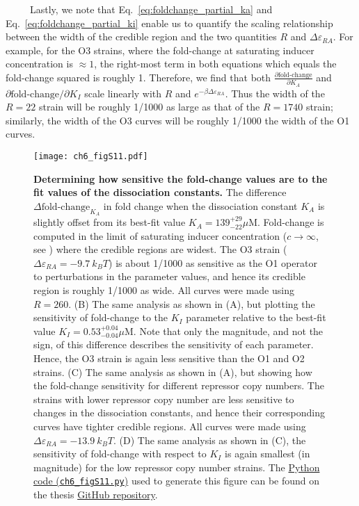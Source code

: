 \documentclass[12pt]{caltech_thesis}
\begin{document}
~~~~~Lastly, we note that Eq.~\ref{eq:foldchange_partial_ka} and
Eq.~\ref{eq:foldchange_partial_ki} enable us to quantify the scaling
relationship between the width of the credible region and the two
quantities \(R\) and \(\Delta\varepsilon_{RA}\). For example, for the O3
strains, where the fold-change at saturating inducer concentration is
\(\approx 1\), the right-most term in both equations which equals the
fold-change squared is roughly 1. Therefore, we find that both
\(\frac{\partial  \text{fold-change}}{\partial K_A}\) and
\(\partial \text{fold-change}/\partial K_I\) scale linearly with \(R\)
and \(e^{-\beta \Delta\varepsilon_{RA}}\). Thus the width of the
\(R=22\) strain will be roughly 1/1000 as large as that of the
\(R=1740\) strain; similarly, the width of the O3 curves will be roughly
1/1000 the width of the O1 curves.

\hypertarget{fig:kaki_sensitivity}{%
\begin{figure}
\centering
\texttt{[image: ch6\_figS11.pdf]}
\caption[{Sensitivity analysis of the fold-change function to \(K_A\)
and \(K_I\) estimates.}]{\textbf{Determining how sensitive the
fold-change values are to the fit values of the dissociation constants.}
The difference \(\Delta \text{fold-change}_{K_A}\) in fold change when
the dissociation constant \(K_A\) is slightly offset from its best-fit
value \(K_A=139^{+29}_{-22} \mu\text{M}\). Fold-change is computed in
the limit of saturating inducer concentration (\(c \rightarrow \infty\),
see ) where the credible regions are widest. The O3 strain
(\(\Delta\varepsilon_{RA} = -9.7~k_B T\)) is about 1/1000 as sensitive
as the O1 operator to perturbations in the parameter values, and hence
its credible region is roughly 1/1000 as wide. All curves were made
using \(R = 260\). (B) The same analysis as shown in (A), but plotting
the sensitivity of fold-change to the \(K_I\) parameter relative to the
best-fit value \(K_I=0.53^{+0.04}_{-0.04} \mu\text{M}\). Note that only
the magnitude, and not the sign, of this difference describes the
sensitivity of each parameter. Hence, the O3 strain is again less
sensitive than the O1 and O2 strains. (C) The same analysis as shown in
(A), but showing how the fold-change sensitivity for different repressor
copy numbers. The strains with lower repressor copy number are less
sensitive to changes in the dissociation constants, and hence their
corresponding curves have tighter credible regions. All curves were made
using \(\Delta\varepsilon_{RA} = -13.9~k_B T\). (D) The same analysis as
shown in (C), the sensitivity of fold-change with respect to \(K_I\) is
again smallest (in magnitude) for the low repressor copy number strains.
The
\href{https://github.com/gchure/phd/blob/master/src/chapter_06/code/ch6_figS11.py}{Python
code (\texttt{ch6\_figS11.py})} used to generate this figure can be
found on the thesis \href{https://github.com/gchure/phd}{GitHub
repository}.}
\label{fig:kaki_sensitivity}
\end{figure}
}
\end{document}
